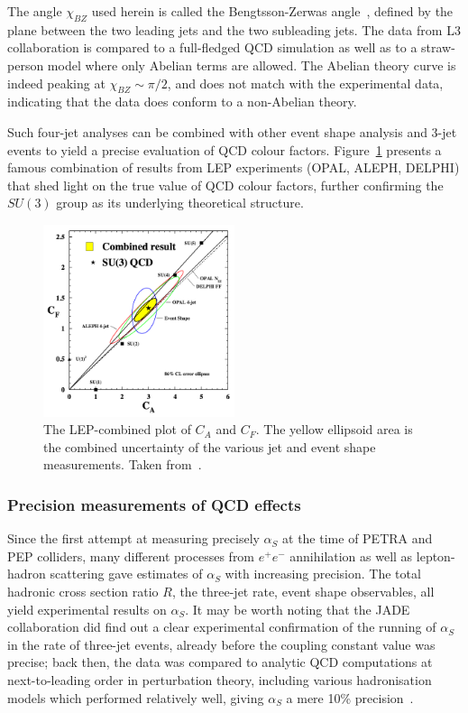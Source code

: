 The angle $\chi_{BZ}$
used herein is called the Bengtsson-Zerwas angle~\cite{xbz}, defined by the
plane between the two leading jets and the two subleading jets. The
data from L3 collaboration is compared to a full-fledged QCD
simulation as well as to a straw-person model where
only Abelian terms are allowed. The Abelian theory curve is indeed peaking at
$\chi_{BZ} \sim \pi/2$, and does not match with the experimental data, indicating that the data does conform to
a non-Abelian theory.

Such four-jet analyses can be combined with other event shape analysis
and 3-jet events to yield a precise evaluation of QCD colour
factors. Figure~\ref{fig:combiLEP} presents a famous combination of results from LEP experiments (OPAL,
ALEPH, DELPHI) that shed light on the true value of QCD colour factors,
further confirming the $SU(3)$ group as its underlying theoretical structure.

\begin{figure}
\begin{center}
  \includegraphics[width=0.5\textwidth]{Chapters/pQCD/combiLEP.png}
 \caption{The LEP-combined plot of $C_{A}$ and $C_{F}$. The yellow
   ellipsoid area is the combined uncertainty of the various jet and
   event shape measurements. Taken from~\cite{webber2}.}
 \label{fig:combiLEP}
\end{center}
\end{figure}

\subsubsection{Precision measurements of QCD effects}
Since the first attempt at measuring precisely $\alpha_{S}$ at the
time of PETRA and PEP colliders, many different processes from
$e^{+}e^{-}$ annihilation as well as lepton-hadron scattering gave
estimates of $\alpha_{S}$ with increasing precision. The total
hadronic cross section ratio $R$, the three-jet rate, event
shape observables, all yield experimental results on $\alpha_{S}$. It
may be worth noting that the JADE collaboration did find out a clear
experimental confirmation of the running of $\alpha_{S}$ in the rate
of three-jet events, already before the coupling constant value was
precise; back then, the data was compared to analytic QCD computations
at next-to-leading order in perturbation theory, including various
hadronisation models which performed relatively well, giving
$\alpha_{S}$ a mere 10\% precision~\cite{Bethke}.


